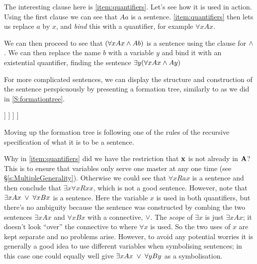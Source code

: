 	The interesting clause here is \ref{item:quantifiers}. Let's see how it is used in action. Using the first clause we can see that $Aa$ is a sentence. \ref{item:quantifiers} then lets us replace $a$ by $x$, and \emph{bind} this with a quantifier, for example $\forall x Ax$. 
	
	We can then proceed to see that  $(\forall x Ax\wedge Ab)$ is a sentence using the clause for $\wedge$. We can then replace the name $b$ with a variable $y$ and bind it with an existential quantifier, finding the sentence $\exists y(\forall x Ax\wedge Ay)$
	
	For more complicated sentences, we can display the structure and construction of the sentence perspicuously by presenting a formation tree, similarly to as we did in
	\ref{S:formationtree}.
	
	\begin{center}
	\begin{forest}
		[$\exists z\forall y (Ryz\eand \exists x Qx)$
			[$\forall y (Ryc\eand\exists x Qx)$
				[$(Rbc\eand \exists x Qx)$
					[$Rbc$]
					[$\exists x Qx$
						[$Qa$]
					]
				]
			]
		]
	\end{forest}
	\end{center}
	Moving up the formation tree is following one of the rules of the recursive specification of what it is to be a sentence.
	
	

Why in \ref{item:quantifiers} did we have the restriction that $\mathbf{x}$ is not already in $\mathbf{A}$? This is to ensure that variables only serve one master at any one time (see \S\ref{s:MultipleGenerality}).
Otherwise we could see that $\forall x Rax$ is a sentence and then conclude that $\exists x\forall x Rxx$, which is not a good sentence.  However, note that $\exists x Ax\;\vee\;\forall x Bx$ is a sentence. Here the variable $x$ is used in both quantifiers, but there's no ambiguity because the sentence was constructed by combing the two sentences $\exists x Ax$ and $\forall xBx$ with a connective, $\vee$. The \emph{scope} of $\exists x$ is just $\exists x Ax$; it doesn't look ``over'' the connective to where $\forall x$ is used. So the two uses of $x$ are kept separate and no problems arise. However, to avoid any potential worries it is generally a good idea to use different variables when symbolising sentences; in this case one could equally well give $\exists x Ax\;\vee\;\forall y By$ as a symbolisation.
 
